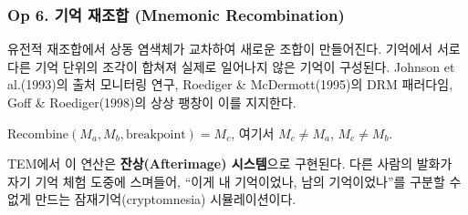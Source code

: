 \documentclass[11pt, a4paper]{article}
\begin{document}
\subsubsection{Op 6. 기억 재조합 (Mnemonic Recombination)}

유전적 재조합에서 상동 염색체가 교차하여 새로운 조합이 만들어진다. 기억에서 서로 다른 기억 단위의 조각이 합쳐져 실제로 일어나지 않은 기억이 구성된다. Johnson et al.(1993)의 출처 모니터링 연구\cite{johnson1993}, Roediger \& McDermott(1995)의 DRM 패러다임\cite{roediger1995}, Goff \& Roediger(1998)의 상상 팽창\cite{goff1998}이 이를 지지한다.

$\text{Recombine}(M_a, M_b, \text{breakpoint}) = M_c$, 여기서 $M_c \neq M_a$, $M_c \neq M_b$.

TEM에서 이 연산은 \textbf{잔상(Afterimage) 시스템}으로 구현된다. 다른 사람의 발화가 자기 기억 체험 도중에 스며들어, ``이게 내 기억이었나, 남의 기억이었나''를 구분할 수 없게 만드는 잠재기억(cryptomnesia) 시뮬레이션이다.
\end{document}
